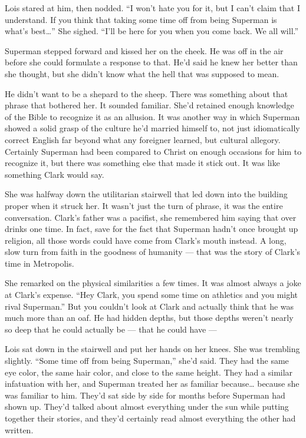 Lois stared at him, then nodded. ``I won't hate you for it, but I can't
claim that I understand. If you think that taking some time off from
being Superman is what's best\ldots{}'' She sighed. ``I'll be here for
you when you come back. We all will.''

Superman stepped forward and kissed her on the cheek. He was off in the
air before she could formulate a response to that. He'd said he knew her
better than she thought, but she didn't know what the hell that was
supposed to mean.

He didn't want to be a shepard to the sheep. There was something about
that phrase that bothered her. It sounded familiar. She'd retained
enough knowledge of the Bible to recognize it as an allusion. It was
another way in which Superman showed a solid grasp of the culture he'd
married himself to, not just idiomatically correct English far beyond
what any foreigner learned, but cultural allegory. Certainly Superman
had been compared to Christ on enough occasions for him to recognize it,
but there was something else that made it stick out. It was like
something Clark would say.

She was halfway down the utilitarian stairwell that led down into the
building proper when it struck her. It wasn't just the turn of phrase,
it was the entire conversation. Clark's father was a pacifist, she
remembered him saying that over drinks one time. In fact, save for the
fact that Superman hadn't once brought up religion, all those words
could have come from Clark's mouth instead. A long, slow turn from faith
in the goodness of humanity --- that was the story of Clark's time in
Metropolis.

She remarked on the physical similarities a few times. It was almost
always a joke at Clark's expense. ``Hey Clark, you spend some time on
athletics and you might rival Superman.'' But you couldn't look at Clark
and actually think that he was much more than an oaf. He had hidden
depths, but those depths weren't nearly so deep that he could actually
be --- that he could have ---

Lois sat down in the stairwell and put her hands on her knees. She was
trembling slightly. ``Some time off from being Superman,'' she'd said.
They had the same eye color, the same hair color, and close to the same
height. They had a similar infatuation with her, and Superman treated
her as familiar because\ldots{} because she was familiar to him. They'd
sat side by side for months before Superman had shown up. They'd talked
about almost everything under the sun while putting together their
stories, and they'd certainly read almost everything the other had
written.

